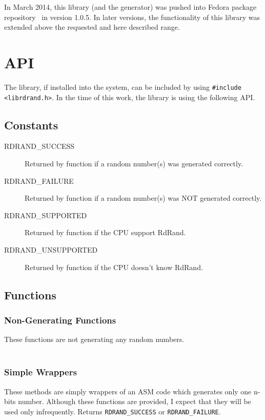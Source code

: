 \par{
In March 2014, this library (and the generator) was pushed into Fedora package repository~\cite{RdRandFedoraPackage,RdRandFedoraPackageBugzilla} in version 1.0.5. 
In later versions, the functionality of this library was extended above the requested and here described range. 
}


\section{API} \label{sec:library-api}
\par{
The library, if installed into the system, can be included by using {\tt \#include <librdrand.h>}. In the time of this work, the library is using the following API.
}
\subsection{Constants}
\begin{description}
  \item[RDRAND\_SUCCESS] Returned by function if a random number(s) was generated correctly.
  \item[RDRAND\_FAILURE] Returned by function if a random number(s) was NOT generated correctly.
  \item[RDRAND\_SUPPORTED] Returned by  function if the CPU support RdRand.
  \item[RDRAND\_UNSUPPORTED] Returned by  function if the CPU doesn't know RdRand.
  
\end{description}


\subsection{Functions}

\subsubsection{Non-Generating Functions}

These functions are not generating any random numbers.\\

\\

\subsubsection{Simple Wrappers}\label{subsec:api:simple-wrappers}
\par{
These methods are simply wrappers of an ASM code which generates only one n-bits number. Although these functions are provided, I expect that they will be used only infrequently. Returns {\tt RDRAND\_SUCCESS} or {\tt RDRAND\_FAILURE}.\\
}


